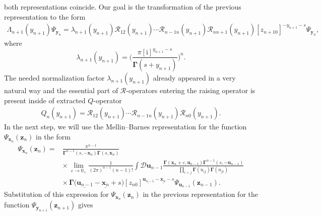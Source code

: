 \documentclass[pdftex]{sigma}
\renewcommand{\imath}{\mathrm{i}}
\numberwithin{equation}{section}
\begin{document}
both representations coincide.
Our goal is the transformation of the previous representation to the form
\begin{align*}
\Lambda_{n+1}(y_{n+1}) \Psi_{\bm{y}_{n}}
=
\lambda_{n+1}(y_{n+1}) \mathcal{R}_{12}(y_{n+1})\cdots
\mathcal{R}_{n-1 n}(y_{n+1})
\mathcal{R}_{n n+1}(y_{n+1}) [z_{n+1 0}]^{-y_{n+1}-s} \Psi_{\bm{y}_{n}} ,
\end{align*}
where
\begin{equation*}
\lambda_{n+1}(y_{n+1}) =
\biggl(\frac{\pi [\imath]^{y_{n+1}-s}}{\mathbf{\Gamma}(s+y_{n+1})}\biggr)^{n}.
\end{equation*}
The needed normalization factor $\lambda_{n+1}(y_{n+1})$ already appeared in a very natural way and the essential part of $\mathcal{R}$-operators entering
the raising operator is present inside of extracted $Q$-operator
\begin{align*}
Q_{n}(y_{n+1}) =
\mathcal{R}_{12}(y_{n+1})\cdots
\mathcal{R}_{n-1 n}(y_{n+1})
\mathcal{R}_{n 0}(y_{n+1}).
\end{align*}
In the next step, we will use the Mellin--Barnes representation for the function $\Psi_{\bm{x}_{n}}(\bm{z}_{n})$ in the form
\begin{align*}
\Psi_{\bm{x}_{n}}(\bm{z}_{n}) ={}&
\frac{\pi^{n-1}}{\mathbf{\Gamma}^{n-1}(s ,-\bm{x}_{n})
\mathbf{\Gamma}(s ,\bm{x}_{n})} \\
& {\times}\,
\lim\limits_{\varepsilon\to 0_+}
\frac{1}{(2\pi)^{n-1} (n-1)!} \int \mathcal{D}\bm{u}_{n-1}
\frac{\mathbf{\Gamma}(\bm x_{n}+\varepsilon,\bm u_{n-1})
\mathbf{\Gamma}^{n-1}(s ,-\bm{u}_{n-1})}
{\prod\limits_{i<j}\mathbf{\Gamma}(u_{ij})\mathbf{\Gamma}(u_{ji})} \\
& {\times}\,
\mathbf{\Gamma}\bigl(\underline{\bm{u}_{n-1}}-\underline{\bm{x}_{n}}+s\bigr)
[z_{n 0}]^{\underline{\bm{u}_{n-1}}-\underline{\bm{x}_{n}}-s}
\Psi_{\bm{u}_{n-1}}(\bm{z}_{n-1}) .
\end{align*}
Substitution of this expression for $\Psi_{\bm{x}_{n}}(\bm{z}_{n})$ in the previous
representation for the function $\Psi_{\bm{y}_{n+1}}(\bm{z}_{n+1})$ gives
\end{document}

